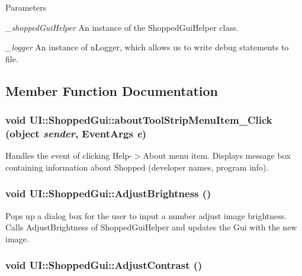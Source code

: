 \begin{DoxyParams}{Parameters}
\item[{\em \_\-shoppedGuiHelper}]An instance of the ShoppedGuiHelper class. \item[{\em \_\-logger}]An instance of nLogger, which allows us to write debug statements to file. \end{DoxyParams}


\subsection{Member Function Documentation}
\hypertarget{class_u_i_1_1_shopped_gui_a04958c8af963e508601e03e14bfb8bb8}{
\subsubsection[{aboutToolStripMenuItem\_\-Click}]{\setlength{\rightskip}{0pt plus 5cm}void UI::ShoppedGui::aboutToolStripMenuItem\_\-Click (object {\em sender}, \/  EventArgs {\em e})}}
\label{class_u_i_1_1_shopped_gui_a04958c8af963e508601e03e14bfb8bb8}
Handles the event of clicking Help-\/$>$About menu item. Displays message box containing information about Shopped (developer names, program info). \hypertarget{class_u_i_1_1_shopped_gui_a3eaf4cafecc8ce1879a496f5ffe9e7a9}{
\subsubsection[{AdjustBrightness}]{\setlength{\rightskip}{0pt plus 5cm}void UI::ShoppedGui::AdjustBrightness ()}}
\label{class_u_i_1_1_shopped_gui_a3eaf4cafecc8ce1879a496f5ffe9e7a9}
Pops up a dialog box for the user to input a number adjust image brightness. Calls AdjustBrightness of ShoppedGuiHelper and updates the Gui with the new image. \hypertarget{class_u_i_1_1_shopped_gui_a61ec62f5b9069ad0694aac24efacb901}{
\subsubsection[{AdjustContrast}]{\setlength{\rightskip}{0pt plus 5cm}void UI::ShoppedGui::AdjustContrast ()}}
